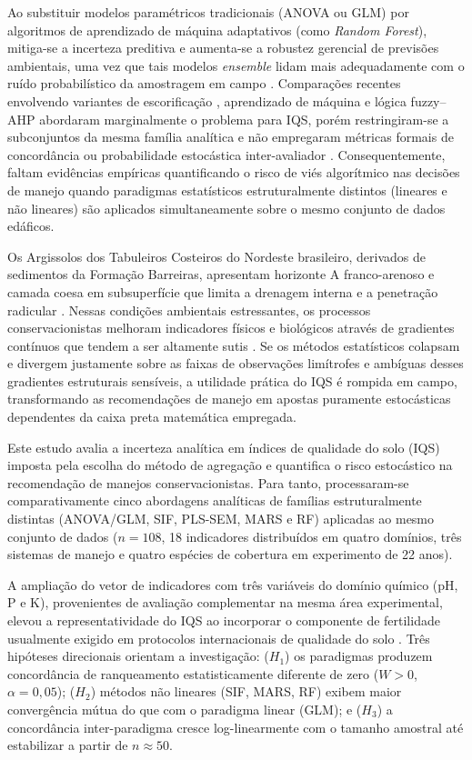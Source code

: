 \documentclass[pdflatex,sn-basic]{sn-jnl}%
\begin{document}
Ao substituir modelos paramétricos tradicionais (ANOVA ou GLM) por algoritmos de aprendizado de máquina adaptativos (como \textit{Random Forest}), mitiga-se a incerteza preditiva e aumenta-se a robustez gerencial de previsões ambientais, uma vez que tais modelos \textit{ensemble} lidam mais adequadamente com o ruído probabilístico da amostragem em campo \cite{Granata2024}. Comparações recentes envolvendo variantes de escorificação \cite{Mukherjee2014}, aprendizado de máquina \cite{Chaudhry2024} e lógica fuzzy--AHP \cite{Pacci2026} abordaram marginalmente o problema para IQS, porém restringiram-se a subconjuntos da mesma família analítica e não empregaram métricas formais de concordância ou probabilidade estocástica inter-avaliador \cite{Venkateswarlu2025,Liu2025}. Consequentemente, faltam evidências empíricas quantificando o risco de viés algorítmico nas decisões de manejo quando paradigmas estatísticos estruturalmente distintos (lineares e não lineares) são aplicados simultaneamente sobre o mesmo conjunto de dados edáficos.

Os Argissolos dos Tabuleiros Costeiros do Nordeste brasileiro, derivados de sedimentos da Formação Barreiras, apresentam horizonte A franco-arenoso e camada coesa em subsuperfície que limita a drenagem interna e a penetração radicular \cite{LimaNeto2010}. Nessas condições ambientais estressantes, os processos conservacionistas melhoram indicadores físicos e biológicos através de gradientes contínuos que tendem a ser altamente sutis \cite{Assuncao2023,Oliveira2020}. Se os métodos estatísticos colapsam e divergem justamente sobre as faixas de observações limítrofes e ambíguas desses gradientes estruturais sensíveis, a utilidade prática do IQS é rompida em campo, transformando as recomendações de manejo em apostas puramente estocásticas dependentes da caixa preta matemática empregada.

Este estudo avalia a incerteza analítica em índices de qualidade do solo (IQS) imposta pela escolha do método de agregação e quantifica o risco estocástico na recomendação de manejos conservacionistas. Para tanto, processaram-se comparativamente cinco abordagens analíticas de famílias estruturalmente distintas (ANOVA/GLM, SIF, PLS-SEM, MARS e RF) aplicadas ao mesmo conjunto de dados ($n = 108$, 18 indicadores distribuídos em quatro domínios, três sistemas de manejo e quatro espécies de cobertura em experimento de 22 anos). 

A ampliação do vetor de indicadores com três variáveis do domínio químico (pH, P e K), provenientes de avaliação complementar na mesma área experimental, elevou a representatividade do IQS ao incorporar o componente de fertilidade usualmente exigido em protocolos internacionais de qualidade do solo \cite{Karlen1997,Andrews2002}. Três hipóteses direcionais orientam a investigação: ($H_1$) os paradigmas produzem concordância de ranqueamento estatisticamente diferente de zero ($W > 0$, $\alpha = 0{,}05$); ($H_2$) métodos não lineares (SIF, MARS, RF) exibem maior convergência mútua do que com o paradigma linear (GLM); e ($H_3$) a concordância inter-paradigma cresce log-linearmente com o tamanho amostral até estabilizar a partir de $n \approx 50$.
\end{document}
